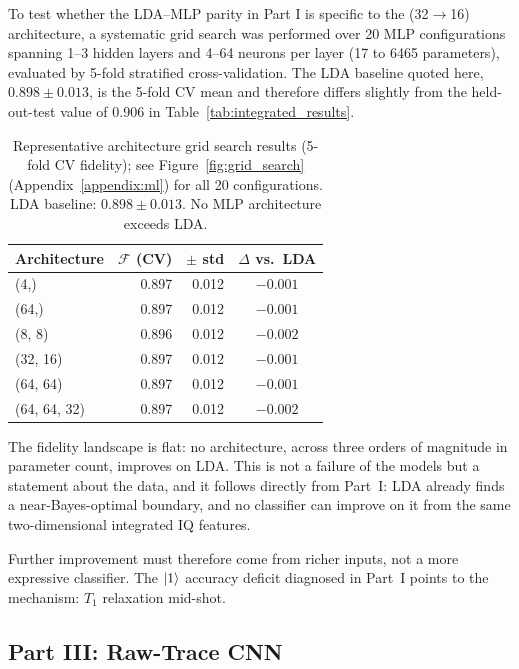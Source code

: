 To test whether the LDA–MLP parity in Part I is specific to the (32$\to$16)
architecture, a systematic grid search was performed over 20 MLP configurations
spanning 1–3 hidden layers and 4–64 neurons per layer (17 to 6465 parameters),
evaluated by 5-fold stratified cross-validation.  The LDA baseline quoted here,
$0.898 \pm 0.013$, is the 5-fold CV mean and therefore differs slightly from the
held-out-test value of 0.906 in Table~\ref{tab:integrated_results}.

\begin{table}[ht]
\centering
\caption{Representative architecture grid search results (5-fold CV fidelity);
         see Figure~\ref{fig:grid_search} (Appendix~\ref{appendix:ml}) for all 20
         configurations. LDA baseline:
         $0.898 \pm 0.013$.  No MLP architecture exceeds LDA.}
\label{tab:arch_search}
\begin{tabular}{lrrc}
\toprule
Architecture & $\mathcal{F}$ (CV) & $\pm$ std & $\Delta$ vs.\ LDA \\
\midrule
(4,)         & 0.897 & 0.012 & $-0.001$ \\
(64,)        & 0.897 & 0.012 & $-0.001$ \\
(8, 8)       & 0.896 & 0.012 & $-0.002$ \\
(32, 16)     & 0.897 & 0.012 & $-0.001$ \\
(64, 64)     & 0.897 & 0.012 & $-0.001$ \\
(64, 64, 32) & 0.897 & 0.012 & $-0.002$ \\
\bottomrule
\end{tabular}
\end{table}

The fidelity landscape is flat: no architecture, across three orders of magnitude
in parameter count, improves on LDA.  This is not a failure of the models but a
statement about the data, and it follows directly from Part~I: LDA already finds a
near-Bayes-optimal boundary, and no classifier can improve on it from the same
two-dimensional integrated IQ features.

Further improvement must therefore come from richer inputs, not a more expressive
classifier.  The $\ket{1}$ accuracy deficit diagnosed in Part~I points to the
mechanism: $T_1$ relaxation mid-shot.

\subsection{Part III: Raw-Trace CNN}
\label{subsec:cnn}

